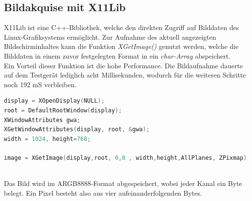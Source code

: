 \subsection{Bildakquise mit X11Lib}
X11Lib ist eine C++-Bibliothek, welche den direkten Zugriff auf Bilddaten des Linux-Grafiksystems ermöglicht. Zur Aufnahme des aktuell angezeigten Bildschirminhaltes kann die Funktion \textit{XGetImage()} genutzt werden, welche die Bilddaten in einem zuvor festgelegten Format in ein \textit{char-Array} abspeichert.\\
Ein Vorteil dieser Funktion ist die hohe Performance. Die Bildaufnahme dauerte auf dem Testgerät lediglich acht Millisekunden, wodurch für die weiteren Schritte noch 192 mS verbleiben.

\begin{lstlisting}[caption=Bildaufnahme mittels X11Lib, label=lst:capture_x11lib, language=C++]
display = XOpenDisplay(NULL);
root = DefaultRootWindow(display);
XWindowAttributes gwa;
XGetWindowAttributes(display, root, &gwa);
width = 1024, height=768;

image = XGetImage(display,root, 0,0 , width,height,AllPlanes, ZPixmap);
\end{lstlisting}
~\\
Das Bild wird im ARGB8888-Format abgespeichert, wobei jeder Kanal ein Byte belegt. Ein Pixel besteht also aus vier aufeinanderfolgenden Bytes.

